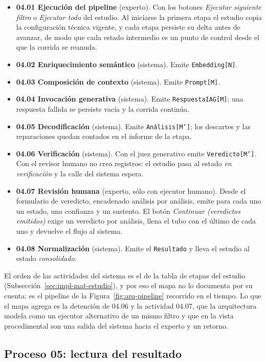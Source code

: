 \documentclass[12pt]{report}
\begin{document}
\begin{itemize}
  \item \textbf{04.01 Ejecución del pipeline} (experto). Con los botones \textit{Ejecutar siguiente filtro} o \textit{Ejecutar todo} del estudio. Al iniciarse la primera etapa el estudio copia la configuración técnica vigente, y cada etapa persiste su delta antes de avanzar, de modo que cada estado intermedio es un punto de control desde el que la corrida se reanuda.
  \item \textbf{04.02 Enriquecimiento semántico} (sistema). Emite \texttt{Embedding[N]}.
  \item \textbf{04.03 Composición de contexto} (sistema). Emite \texttt{Prompt[M]}.
  \item \textbf{04.04 Invocación generativa} (sistema). Emite \texttt{RespuestaIAG[M]}; una respuesta fallida se persiste vacía y la corrida continúa.
  \item \textbf{04.05 Decodificación} (sistema). Emite \texttt{Análisis[M']}; los descartes y las reparaciones quedan contados en el informe de la etapa.
  \item \textbf{04.06 Verificación} (sistema). Con el juez generativo emite \texttt{Veredicto[M']}. Con el revisor humano no crea registros: el estudio pasa al estado \textit{en verificación} y la calle del sistema espera.
  \item \textbf{04.07 Revisión humana} (experto, sólo con ejecutor humano). Desde el formulario de veredicto, encadenado análisis por análisis, emite para cada uno un estado, una confianza y un sustento. El botón \textit{Continuar (veredictos emitidos)} exige un veredicto por análisis, llena el tubo con el último de cada uno y devuelve el flujo al sistema.
  \item \textbf{04.08 Normalización} (sistema). Emite el \texttt{Resultado} y lleva el estudio al estado \textit{consolidado}.
\end{itemize}



El orden de las actividades del sistema es el de la tabla de etapas del estudio (Subsección~\ref{sec:impl-mat-estudio}), y por eso el mapa no lo documenta por su cuenta: es el pipeline de la Figura~\ref{fig:arq-pipeline} recorrido en el tiempo. Lo que el mapa agrega es la detención de 04.06 y la actividad 04.07, que la arquitectura modela como un ejecutor alternativo de un mismo filtro y que en la vista procedimental son una salida del sistema hacia el experto y un retorno.

\subsection{Proceso 05: lectura del resultado}
\label{sec:proc-visualizacion}
\end{document}
